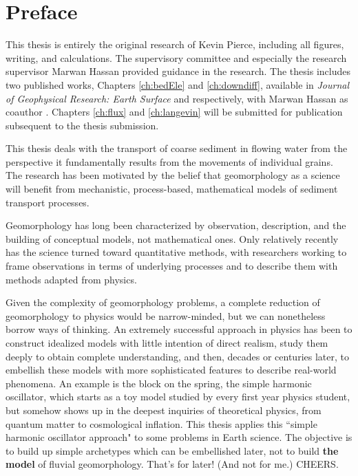 
\chapter{Preface}

This thesis is entirely the original research of Kevin Pierce, including all figures, writing, and calculations.
The supervisory committee and especially the research supervisor Marwan Hassan provided guidance in the research.
The thesis includes two published works, Chapters \ref{ch:bedEle} and \ref{ch:downdiff}, available in \textit{Journal of Geophysical Research: Earth Surface} and \citet{Geophysical Research Letters} respectively, with Marwan Hassan as coauthor \citep{Pierce2020a,Pierce2020b}. Chapters \ref{ch:flux} and \ref{ch:langevin} will be submitted for publication subsequent to the thesis submission.


This thesis deals with the transport of coarse sediment in flowing water from the perspective it fundamentally results from the movements of individual grains.
The research has been motivated by the belief that geomorphology as a science will benefit from mechanistic, process-based, mathematical models of sediment transport processes.

Geomorphology has long been characterized by observation, description, and the building of conceptual models, not mathematical ones.
Only relatively recently has the science turned toward quantitative methods, with researchers working to frame observations in terms of underlying processes and to describe them with methods adapted from physics.

Given the complexity of geomorphology problems, a complete reduction of geomorphology to physics would be narrow-minded, but we can nonetheless borrow ways of thinking.
An extremely successful approach in physics has been to construct idealized models with little intention of direct realism, study them deeply to obtain complete understanding, and then, decades or centuries later, to embellish these models with more sophisticated features to describe real-world phenomena.
An example is the block on the spring, the simple harmonic oscillator, which starts as a toy model studied by every first year physics student, but somehow shows up in the deepest inquiries of theoretical physics, from quantum matter to cosmological inflation.
This thesis applies this ``simple harmonic oscillator approach" to some problems in Earth science.
The objective is to build up simple archetypes which can be embellished later, not to build \textbf{the model} of fluvial geomorphology. 
That's for later! (And not for me.) CHEERS.
